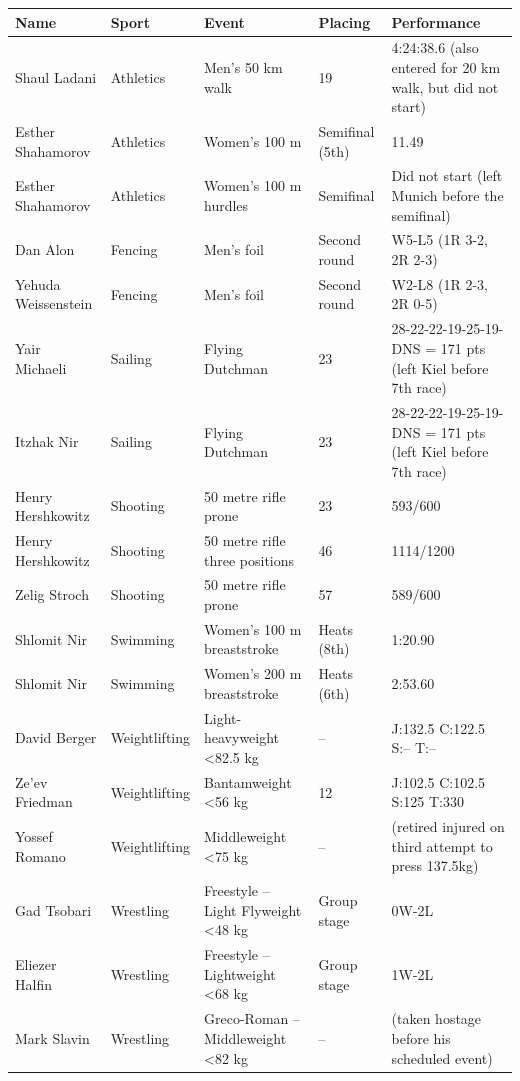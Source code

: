 \documentclass{article}
\begin{document}
\begin{tabular}{lllll}
\toprule
Name & Sport & Event & Placing & Performance \\
\midrule
Shaul Ladani & Athletics & Men's 50 km walk & 19 & 4:24:38.6 (also entered for 20 km walk, but did not start) \\
Esther Shahamorov & Athletics & Women's 100 m & Semifinal (5th) & 11.49 \\
Esther Shahamorov & Athletics & Women's 100 m hurdles & Semifinal & Did not start (left Munich before the semifinal) \\
Dan Alon & Fencing & Men's foil & Second round & W5-L5 (1R 3-2, 2R 2-3) \\
Yehuda Weissenstein & Fencing & Men's foil & Second round & W2-L8 (1R 2-3, 2R 0-5) \\
Yair Michaeli & Sailing & Flying Dutchman & 23 & 28-22-22-19-25-19-DNS = 171 pts (left Kiel before 7th race) \\
Itzhak Nir & Sailing & Flying Dutchman & 23 & 28-22-22-19-25-19-DNS = 171 pts (left Kiel before 7th race) \\
Henry Hershkowitz & Shooting & 50 metre rifle prone & 23 & 593/600 \\
Henry Hershkowitz & Shooting & 50 metre rifle three positions & 46 & 1114/1200 \\
Zelig Stroch & Shooting & 50 metre rifle prone & 57 & 589/600 \\
Shlomit Nir & Swimming & Women's 100 m breaststroke & Heats (8th) & 1:20.90 \\
Shlomit Nir & Swimming & Women's 200 m breaststroke & Heats (6th) & 2:53.60 \\
David Berger & Weightlifting & Light-heavyweight <82.5 kg & -- & J:132.5 C:122.5 S:-- T:-- \\
Ze'ev Friedman & Weightlifting & Bantamweight <56 kg & 12 & J:102.5 C:102.5 S:125 T:330 \\
Yossef Romano & Weightlifting & Middleweight <75 kg & -- & (retired injured on third attempt to press 137.5kg) \\
Gad Tsobari & Wrestling & Freestyle -- Light Flyweight <48 kg & Group stage & 0W-2L \\
Eliezer Halfin & Wrestling & Freestyle -- Lightweight <68 kg & Group stage & 1W-2L \\
Mark Slavin & Wrestling & Greco-Roman -- Middleweight <82 kg & -- & (taken hostage before his scheduled event) \\
\bottomrule
\end{tabular}
\end{document}
